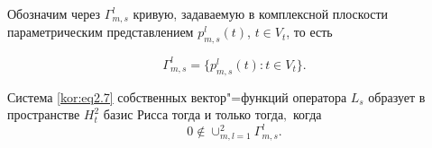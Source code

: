 \smallskip





Обозначим через $\Gamma_{m,s}^l$ кривую, задаваемую в комплексной плоскости параметрическим представлением $p_{m,s}^l(t)$, $t\in V_t$, то есть

$$\Gamma_{m,s}^l=\{p_{m,s}^l(t):t\in V_t\}.$$



\smallskip



\hypertarget{korn:lemma:9}{}



\begin{lemma}[9]Система \eqref{kor:eq2.7} собственных вектор"=функций оператора $L_s$ образует в пространстве $H_t^2$ базис Рисса тогда и только тогда$,$ когда $$0\notin\cup_{m,l=1}^2\Gamma_{m,s}^l.$$

\end{lemma}



\smallskip



